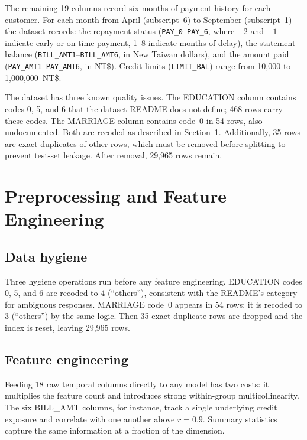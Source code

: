 \documentclass[12pt,a4paper]{article}
\begin{document}
The remaining 19 columns record six months of payment history for each
customer. For each month from April (subscript~6) to September (subscript~1)
the dataset records: the repayment status (\texttt{PAY\_0}--\texttt{PAY\_6},
where $-2$ and $-1$ indicate early or on-time payment, 1--8 indicate months
of delay), the statement balance (\texttt{BILL\_AMT1}--\texttt{BILL\_AMT6},
in New Taiwan dollars), and the amount paid (\texttt{PAY\_AMT1}--\texttt{PAY\_AMT6},
in NT\$). Credit limits (\texttt{LIMIT\_BAL}) range from 10,000 to
1,000,000~NT\$.

The dataset has three known quality issues. The EDUCATION column contains
codes 0, 5, and 6 that the dataset README does not define; 468 rows carry
these codes. The MARRIAGE column contains code~0 in 54 rows, also
undocumented. Both are recoded as described in Section~\ref{sec:preprocessing}.
Additionally, 35 rows are exact duplicates of other rows, which must be
removed before splitting to prevent test-set leakage. After removal,
29,965 rows remain.

\section{Preprocessing and Feature Engineering}
\label{sec:preprocessing}

\subsection{Data hygiene}

Three hygiene operations run before any feature engineering. EDUCATION codes
0, 5, and 6 are recoded to 4 (``others''), consistent with the README's
category for ambiguous responses. MARRIAGE code~0 appears in 54 rows; it is
recoded to 3 (``others'') by the same logic. Then 35 exact duplicate rows are
dropped and the index is reset, leaving 29,965 rows.

\subsection{Feature engineering}

Feeding 18 raw temporal columns directly to any model has two costs: it
multiplies the feature count and introduces strong within-group
multicollinearity. The six BILL\_AMT columns, for instance, track a single
underlying credit exposure and correlate with one another above $r = 0.9$.
Summary statistics capture the same information at a fraction of the dimension.
\end{document}
